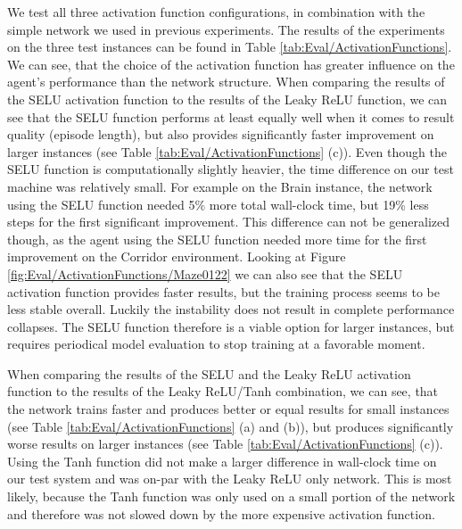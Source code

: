 We test all three activation function configurations, in combination with the simple network we used in previous experiments. The results of the experiments on the three test instances can be found in Table \ref{tab:Eval/ActivationFunctions}. We can see, that the choice of the activation function has greater influence on the agent's performance than the network structure. When comparing the results of the SELU activation function to the results of the Leaky ReLU function, we can see that the SELU function performs at least equally well when it comes to result quality (episode length), but also provides significantly faster improvement on larger instances (see Table \ref{tab:Eval/ActivationFunctions} (c)). Even though the SELU function is computationally slightly heavier, the time difference on our test machine was relatively small. For example on the Brain instance, the network using the SELU function needed 5\% more total wall-clock time, but 19\% less steps for the first significant improvement. This difference can not be generalized though, as the agent using the SELU function needed more time for the first improvement on the Corridor environment. Looking at Figure \ref{fig:Eval/ActivationFunctions/Maze0122} we can also see that the SELU activation function provides faster results, but the training process seems to be less stable overall. Luckily the instability does not result in complete performance collapses. The SELU function therefore is a viable option for larger instances, but requires periodical model evaluation to stop training at a favorable moment.

When comparing the results of the SELU and the Leaky ReLU activation function to the results of the Leaky ReLU/Tanh combination, we can see, that the network trains faster and produces better or equal results for small instances (see Table \ref{tab:Eval/ActivationFunctions} (a) and (b)), but produces significantly worse results on larger instances (see Table \ref{tab:Eval/ActivationFunctions} (c)). Using the Tanh function did not make a larger difference in wall-clock time on our test system and was on-par with the Leaky ReLU only network. This is most likely, because the Tanh function was only used on a small portion of the network and therefore was not slowed down by the more expensive activation function.

